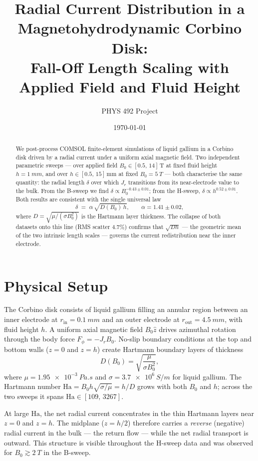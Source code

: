 \documentclass[11pt, a4paper]{article}
\title{Radial Current Distribution in a Magnetohydrodynamic Corbino Disk:\\
       Fall-Off Length Scaling with Applied Field and Fluid Height}
\author{PHYS 492 Project}
\date{\today}
\begin{document}
\maketitle

\begin{abstract}
We post-process COMSOL finite-element simulations of liquid gallium in a Corbino disk
driven by a radial current under a uniform axial magnetic field.
Two independent parametric sweeps — over applied field $B_0 \in [0.5,\,14]$\,T at
fixed fluid height $h = \SI{1}{mm}$, and over $h \in [0.5,\,15]$\,mm at fixed
$B_0 = \SI{5}{T}$ — both characterise the same quantity: the radial length $\delta$
over which $J_r$ transitions from its near-electrode value to the bulk.
From the B-sweep we find $\delta \propto B_0^{-0.43\pm0.01}$; from the H-sweep,
$\delta \propto h^{0.52\pm0.01}$.
Both results are consistent with the single universal law
\[
   \delta \;=\; \alpha\,\sqrt{D(B_0)\,h}, \qquad \alpha = 1.41 \pm 0.02,
\]
where $D = \sqrt{\mu/(\sigma B_0^2)}$ is the Hartmann layer thickness.
The collapse of both datasets onto this line (RMS scatter 4.7\%) confirms that
$\sqrt{Dh}$ — the geometric mean of the two intrinsic length scales — governs the
current redistribution near the inner electrode.
\end{abstract}

\section{Physical Setup}

The Corbino disk consists of liquid gallium filling an annular region between an inner
electrode at $r_\mathrm{in} = \SI{0.1}{mm}$ and an outer electrode at
$r_\mathrm{out} = \SI{4.5}{mm}$, with fluid height $h$.
A uniform axial magnetic field $B_0\hat{z}$ drives azimuthal rotation through the
body force $F_\phi = -J_r B_0$.
No-slip boundary conditions at the top and bottom walls ($z = 0$ and $z = h$) create
Hartmann boundary layers of thickness
\begin{equation}
    D(B_0) = \sqrt{\frac{\mu}{\sigma B_0^2}},
    \label{eq:D}
\end{equation}
where $\mu = \SI{1.95e-3}{Pa.s}$ and $\sigma = \SI{3.7e6}{S/m}$ for liquid gallium.
The Hartmann number $\mathrm{Ha} = B_0 h\sqrt{\sigma/\mu} = h/D$ grows with both
$B_0$ and $h$; across the two sweeps it spans $\mathrm{Ha} \in [109,\,3267]$.

At large $\mathrm{Ha}$, the net radial current concentrates in the thin Hartmann
layers near $z=0$ and $z=h$.
The midplane ($z=h/2$) therefore carries a \emph{reverse} (negative) radial current
in the bulk — the return flow — while the net radial transport is outward.
This structure is visible throughout the H-sweep data and was observed for
$B_0 \gtrsim \SI{2}{T}$ in the B-sweep.
\end{document}
